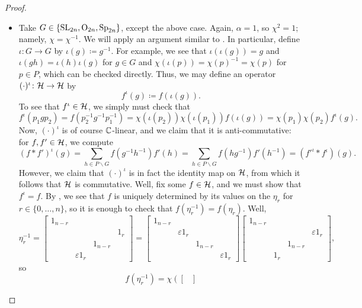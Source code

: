 \begin{proof}
\begin{itemize}
        \item Take $G\in\{\mathrm{SL}_{2n},\mathrm{O}_{2n},\mathrm{Sp}_{2n}\}$, except the above case. Again, $\alpha=1$, so $\chi^2=1$; namely, $\chi=\chi^{-1}$. We will apply an argument similar to \cite[Theorem~45.2]{bump-lie-group}. In particular, define $\iota\colon G\to G$ by $\iota(g)\coloneqq g^{-1}$. For example, we see that $\iota(\iota(g))=g$ and $\iota(gh)=\iota(h)\iota(g)$ for $g\in G$ and $\chi(\iota(p))=\chi(p)^{-1}=\chi(p)$ for $p\in P$, which can be checked directly. Thus, we may define an operator $(\cdot)^\iota\colon\mathcal{H}\to\mathcal{H}$ by
        \[f^\iota(g)\coloneqq f(\iota(g)).\]
        To see that $f^\iota\in\mathcal{H}$, we simply must check that
        \[f^\iota(p_1gp_2)=f\left(p_2^{-1}g^{-1}p_1^{-1}\right)=\chi(\iota(p_2))\chi(\iota(p_1))f(\iota(g))=\chi(p_1)\chi(p_2)f^\iota(g).\]
        Now, $(\cdot)^\iota$ is of course $\mathbb C$-linear, and we claim that it is anti-commutative: for $f,f'\in\mathcal{H}$, we compute
        \[(f*f')^\iota(g)=\sum_{h\in P\backslash G}f\left(g^{-1}h^{-1}\right)f'(h)=\sum_{h\in P\backslash G}f\left(hg^{-1}\right)f'\left(h^{-1}\right)=(f'^\iota*f^\iota)(g).\]
        However, we claim that $(\cdot)^\iota$ is in fact the identity map on $\mathcal{H}$, from which it follows that $\mathcal{H}$ is commutative. Well, fix some $f\in\mathcal{H}$, and we must show that $f^\iota=f$. By , we see that $f$ is uniquely determined by its values on the $\eta_r$ for $r\in\{0,\ldots,n\}$, so it is enough to check that $f\left(\eta_r^{-1}\right)=f(\eta_r)$. Well,
        \[\eta_r^{-1} = \begin{bmatrix}
            1_{n-r} \\
            &&& 1_{r} \\
            && 1_{n-r} \\
            & \varepsilon 1_{r}
        \end{bmatrix} = \begin{bmatrix}
            1_{n-r} \\ & \varepsilon1_{r} \\ && 1_{n-r} \\ &&& \varepsilon1_{r}
        \end{bmatrix}\begin{bmatrix}
            1_{n-r} \\
            &&& \varepsilon 1_{r} \\
            && 1_{n-r} \\
            & 1_{r}
        \end{bmatrix},\]
        so
        \[f\left(\eta_r^{-1}\right)=\chi\left(\begin{bmatrix}

\end{bmatrix}\]
\end{itemize}
\end{proof}

